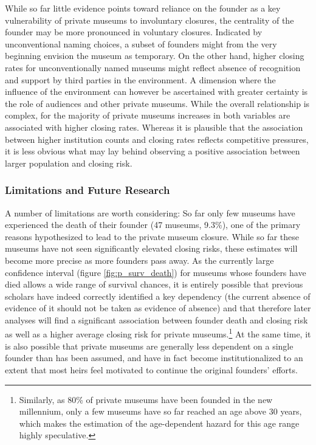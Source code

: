 \documentclass[12pt]{article}
\begin{document}
While so far little evidence points toward reliance on the founder as a key vulnerability of private museums to involuntary closures, the centrality of the founder may be more pronounced in voluntary closures.
Indicated by unconventional naming choices, a subset of founders might from the very beginning envision the museum as temporary.
On the other hand, higher closing rates for unconventionally named museums might reflect absence of recognition and support by third parties in the environment.
A dimension where the influence of the environment can however be ascertained with greater certainty is the role of audiences and other private museums.
While the overall relationship is complex, for the majority of private museums increases in both variables are associated with higher closing rates.
Whereas it is plausible that the association between higher institution counts and closing rates reflects competitive pressures, it is less obvious what may lay behind observing a positive association between larger population and closing risk. 
\subsubsection*{Limitations and Future Research}




A number of limitations are worth considering:
So far only few museums have experienced the death of their founder (47 museums, 9.3\%), one of the primary reasons hypothesized to lead to the private museum closure. 
While so far these museums have not seen significantly elevated closing risks, these estimates will become more precise as more founders pass away.
As the currently large confidence interval (figure \ref{fig:p_surv_death}) for museums whose founders have died allows a wide range of survival chances, it is entirely possible that previous scholars have indeed correctly identified a key dependency (the current absence of evidence of it should not be taken as evidence of absence) and that therefore later analyses will find a significant association between founder death and closing risk as well as a higher average closing risk for private museums.\footnote{Similarly, as 80\% of private museums have been founded in the new millennium, only a few museums have so far reached an age above 30 years, which makes the estimation of the age-dependent hazard for this age range highly speculative.}
At the same time, it is also possible that private museums are generally less dependent on a single founder than has been assumed, and have in fact become institutionalized to an extent that most heirs feel motivated to continue the original founders' efforts.
\end{document}
